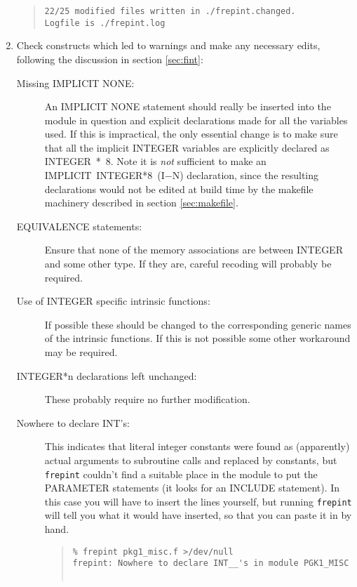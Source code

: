 \documentclass[twoside,11pt]{article}
\newcommand{\htmlref}[2]{#1}
\newcommand{\latexhtml}[2]{#1}
\renewcommand{\_}{\texttt{\symbol{95}}}
\newcommand{\xroutine}[1]{\htmlref{{\tt #1}}{#1}}
\newcommand{\routine}[1]{{\tt #1}}
\newenvironment{squote}{\begin{quote}\begin{small}}{\end{small}\end{quote}}
\begin{document}
\begin{enumerate}
\begin{squote}
\begin{verbatim}
22/25 modified files written in ./frepint.changed.
Logfile is ./frepint.log
\end{verbatim}
\end{squote}
%
\item
Check constructs which led to warnings and make any necessary edits,
following the discussion in section \ref{sec:fint}:
\begin{description}
%
\item[Missing IMPLICIT NONE:]
An IMPLICIT NONE statement should really 
be inserted into the module in question and 
explicit declarations made for all the variables used.
If this is impractical, the only essential change is to make sure that
all the implicit INTEGER variables are explicitly declared as INTEGER~*~8.
Note it is {\it not\/} sufficient to make an 
IMPLICIT~INTEGER*8~(I\latexhtml{$-$}{-}N)
declaration, since the resulting declarations would not be edited 
at build time by
the makefile machinery described in section \ref{sec:makefile}.
%
\item[EQUIVALENCE statements:]
Ensure that none of the memory associations are between INTEGER and some
other type.  If they are, careful recoding will probably be required.
%
\item[Use of INTEGER specific intrinsic functions:]
If possible these should be changed to the corresponding generic 
names of the intrinsic functions.
If this is not possible some other workaround may be required.
%
\item[INTEGER*n declarations left unchanged:]
These probably require no further modification.
%
\item[Nowhere to declare INT\_\_'s:]
This indicates that literal integer constants were found as (apparently)
actual arguments to subroutine calls and replaced by constants,
but \xroutine{frepint} couldn't find a suitable place in
the module to put the PARAMETER statements (it looks for an INCLUDE 
statement).  In this case you will have to insert the lines yourself,
but running \routine{frepint} will tell you what it would have inserted,
so that you can paste it in by hand.
\begin{squote}
\begin{verbatim}
% frepint pkg1_misc.f >/dev/null
frepint: Nowhere to declare INT__'s in module PGK1_MISC


\end{verbatim}
\end{squote}
\end{description}
\end{enumerate}
\end{document}
